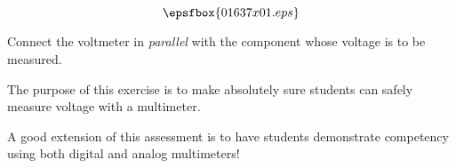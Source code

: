 

$$\epsfbox{01637x01.eps}$$

\vfil \eject






Connect the voltmeter in {\it parallel} with the component whose voltage is to be measured.







The purpose of this exercise is to make absolutely sure students can safely measure voltage with a multimeter.  

A good extension of this assessment is to have students demonstrate competency using both digital and analog multimeters!




